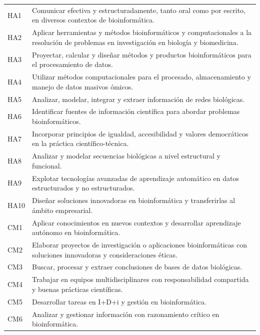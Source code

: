 \documentclass[
  11pt,
  a4paper,
  twoside]{scrreprt}
\begin{document}
\begin{longtable}{
p{1.5cm}
p{12.5cm}}
HA1 & Comunicar efectiva y estructuradamente, tanto oral como por escrito, en diversos contextos de bioinformática. \\
HA2 & Aplicar herramientas y métodos bioinformáticos y computacionales a la resolución de problemas en investigación en biología y biomedicina. \\
HA3 & Proyectar, calcular y diseñar métodos y productos bioinformáticos para el procesamiento de datos. \\
HA4 & Utilizar métodos computacionales para el procesado, almacenamiento y manejo de datos masivos ómicos. \\
HA5 & Analizar, modelar, integrar y extraer información de redes biológicas. \\
HA6 & Identificar fuentes de información científica para abordar problemas bioinformáticos. \\
HA7 & Incorporar principios de igualdad, accesibilidad y valores democráticos en la práctica científico-técnica. \\
HA8 & Analizar y modelar secuencias biológicas a nivel estructural y funcional. \\
HA9 & Explotar tecnologías avanzadas de aprendizaje automático en datos estructurados y no estructurados. \\
HA10 & Diseñar soluciones innovadoras en bioinformática y transferirlas al ámbito empresarial. \\

CM1 & Aplicar conocimientos en nuevos contextos y desarrollar aprendizaje autónomo en bioinformática. \\
CM2 & Elaborar proyectos de investigación o aplicaciones bioinformáticas con soluciones innovadoras y consideraciones éticas. \\
CM3 & Buscar, procesar y extraer conclusiones de bases de datos biológicas. \\
CM4 & Trabajar en equipos multidisciplinares con responsabilidad compartida y buenas prácticas científicas. \\
CM5 & Desarrollar tareas en I+D+i y gestión en bioinformática. \\
CM6 & Analizar y gestionar información con razonamiento crítico en bioinformática. \\

\hline

\end{longtable}

\vspace{11mm}
\end{document}
